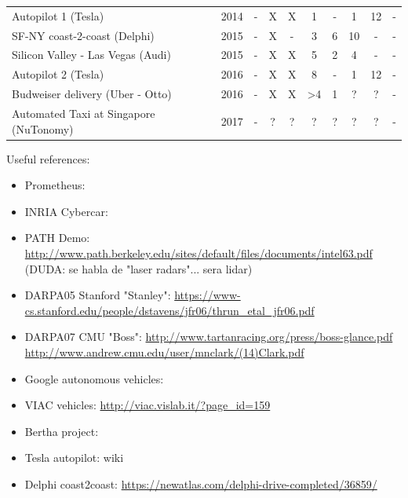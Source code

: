 \begin{table}[H]
\begin{tabularx}{\linewidth}{L r c c c c c c c c}
        Autopilot 1   (Tesla)                         & 2014  & - & X & X &  1 &  - &  1 & 12 & - \\
        SF-NY coast-2-coast (Delphi)                  & 2015  & - & X & - &  3 &  6 & 10 &  - & - \\
        Silicon Valley - Las Vegas (Audi)             & 2015  & - & X & X &  5 &  2 &  4 &  - & - \\   
        Autopilot 2 (Tesla)                           & 2016  & - & X & X &  8 &  - &  1 & 12 & - \\  
        Budweiser delivery (Uber - Otto)              & 2016  & - & X & X & >4 &  1 &  ? &  ? & - \\
        Automated Taxi at Singapore (NuTonomy)        & 2017  & - & ? & ? &  ? &  ? &  ? &  ? & - \\    
    \end{tabularx}
\end{table}

Useful references:
\begin{itemize}
    \item Prometheus: 
    \item INRIA Cybercar:
    \item PATH Demo: \url{http://www.path.berkeley.edu/sites/default/files/documents/intel63.pdf} (DUDA: se habla de "laser radars"... sera lidar)
    \item DARPA05 Stanford "Stanley":  \url{https://www-cs.stanford.edu/people/dstavens/jfr06/thrun_etal_jfr06.pdf}  
    \item DARPA07 CMU "Boss":  \url{http://www.tartanracing.org/press/boss-glance.pdf} \url{http://www.andrew.cmu.edu/user/mnclark/(14)Clark.pdf}
    \item Google autonomous vehicles: 
    \item VIAC vehicles:  \url{http://viac.vislab.it/?page_id=159}
    \item Bertha project:
    \item Tesla autopilot: wiki
    \item Delphi coast2coast: \url{https://newatlas.com/delphi-drive-completed/36859/}
\end{itemize}

